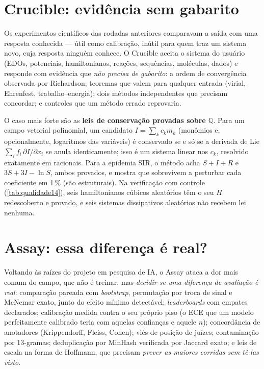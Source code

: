 \section{Crucible: evidência sem gabarito}\label{sec:banc-crucible}

Os experimentos científicos das rodadas anteriores comparavam a saída com uma resposta conhecida --- útil como calibração, inútil para quem traz um sistema novo, cuja resposta ninguém conhece. O Crucible aceita o sistema do usuário (EDOs, potenciais, hamiltonianos, reações, sequências, moléculas, dados) e responde com evidência que \emph{não precisa de gabarito}: a ordem de convergência observada por Richardson; teoremas que valem para qualquer entrada (virial, Ehrenfest, trabalho--energia); dois métodos independentes que precisam concordar; e controles que um método errado reprovaria.

O caso mais forte são as \textbf{leis de conservação provadas sobre $\mathbb{Q}$}. Para um campo vetorial polinomial, um candidato $I = \sum_k c_k m_k$ (monômios e, opcionalmente, logaritmos das variáveis) é conservado se e só se a derivada de Lie $\sum_i f_i \,\partial I/\partial x_i$ se anula identicamente; isso é um sistema linear nos $c_k$, resolvido exatamente em racionais. Para a epidemia SIR, o método acha $S + I + R$ e $3S + 3I - \ln S$, ambos provados, e mostra que sobrevivem a perturbar cada coeficiente em 1\,\% (são estruturais). Na verificação com controle (\autoref{tab:qualidade14}), seis hamiltonianos cúbicos aleatórios têm o seu $H$ redescoberto e provado, e seis sistemas dissipativos aleatórios não recebem lei nenhuma.

\section{Assay: essa diferença é real?}\label{sec:banc-assay}

Voltando às raízes do projeto em pesquisa de IA, o Assay ataca a dor mais comum do campo, que não é treinar, mas \emph{decidir se uma diferença de avaliação é real}: comparação pareada com \textit{bootstrap}, permutação por troca de sinal e McNemar exato, junto do efeito mínimo detectável; \textit{leaderboards} com empates declarados; calibração medida contra o seu próprio piso (o ECE que um modelo perfeitamente calibrado teria com aquelas confianças e aquele $n$); concordância de anotadores (Krippendorff, Fleiss, Cohen); viés de posição de juízes; contaminação por 13-gramas; deduplicação por MinHash verificada por Jaccard exato; e leis de escala na forma de Hoffmann, que precisam \emph{prever as maiores corridas sem tê-las visto}.

